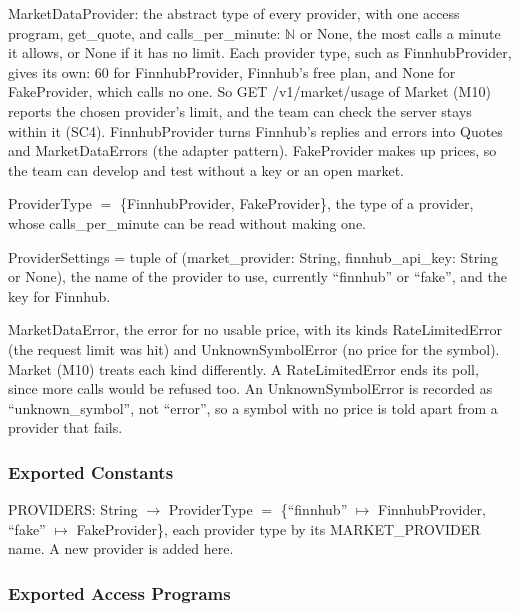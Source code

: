 \documentclass[12pt, titlepage]{article}
\begin{document}
\medskip
{\raggedright
\noindent MarketDataProvider: the abstract type of every provider, with one
access program, get\_quote, and calls\_per\_minute: $\mathbb{N}$ or None, the
most calls a minute it allows, or None if it has no limit. Each provider type,
such as FinnhubProvider, gives its own: 60 for FinnhubProvider, Finnhub's free plan, and None for
FakeProvider, which calls no one. So GET /v1/market/usage of Market (M10)
reports the chosen provider's limit, and the team can check the server stays
within it (SC4). FinnhubProvider turns Finnhub's replies and errors
into Quotes and MarketDataErrors (the adapter pattern). FakeProvider makes up
prices, so the team can develop and test without a key or an open market.\par}

\medskip
{\raggedright
\noindent ProviderType $=$ \{FinnhubProvider, FakeProvider\}, the type of a
provider, whose calls\_per\_minute can be read without making one.\par}

\medskip
\noindent ProviderSettings = tuple of (market\_provider: String,
finnhub\_api\_key: String or None), the name of the provider to use,
currently ``finnhub'' or ``fake'', and the key for Finnhub.

\medskip
\noindent MarketDataError, the error for no usable price, with its kinds
RateLimitedError (the request limit was hit) and UnknownSymbolError (no price
for the symbol). Market (M10) treats each kind differently. A RateLimitedError
ends its poll, since more calls would be refused too. An UnknownSymbolError is
recorded as ``unknown\_symbol'', not ``error'', so a symbol with no price is told
apart from a provider that fails.

\subsubsection{Exported Constants}

\noindent PROVIDERS: String $\rightarrow$ ProviderType $=$ \{``finnhub''
$\mapsto$ FinnhubProvider, ``fake'' $\mapsto$ FakeProvider\}, each provider type
by its MARKET\_PROVIDER name. A new provider is added here.

\subsubsection{Exported Access Programs}
\end{document}
